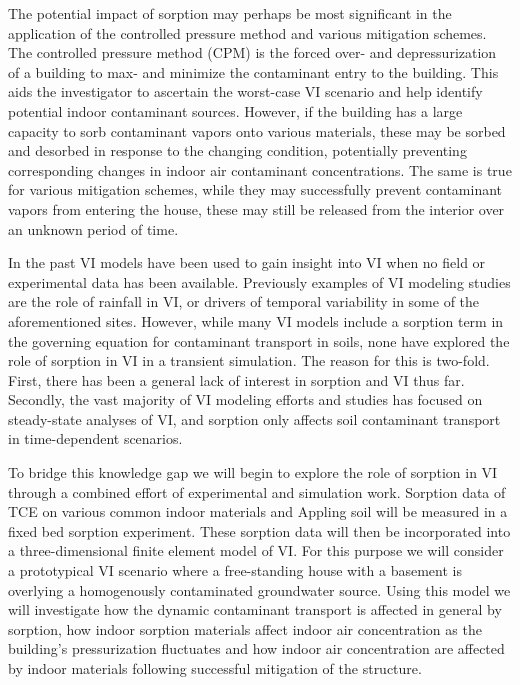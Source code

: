 The potential impact of sorption may perhaps be most significant in the application of the controlled pressure method and various mitigation schemes.
The controlled pressure method (CPM) is the forced over- and depressurization of a building to max- and minimize the contaminant entry to the building.
This aids the investigator to ascertain the worst-case VI scenario and help identify potential indoor contaminant sources\cite{mchugh_recent_2017,holton_long-term_2015}.
However, if the building has a large capacity to sorb contaminant vapors onto various materials, these may be sorbed and desorbed in response to the changing condition, potentially preventing corresponding changes in indoor air contaminant concentrations.
The same is true for various mitigation schemes, while they may successfully prevent contaminant vapors from entering the house, these may still be released from the interior over an unknown period of time\cite{meininghaus_diffusion_2000,meininghaus_diffusion_2002}.\par

In the past VI models have been used to gain insight into VI when no field or experimental data has been available.
Previously examples of VI modeling studies are the role of rainfall in VI\cite{shen_numerical_2012}, or drivers of temporal variability in some of the aforementioned sites\cite{strom_factors_2019}.
However, while many VI models include a sorption term in the governing equation for contaminant transport in soils, none have explored the role of sorption in VI in a transient simulation.
The reason for this is two-fold.
First, there has been a general lack of interest in sorption and VI thus far.
Secondly, the vast majority of VI modeling efforts and studies has focused on steady-state analyses of VI, and sorption only affects soil contaminant transport in time-dependent scenarios.\par

To bridge this knowledge gap we will begin to explore the role of sorption in VI through a combined effort of experimental and simulation work.
Sorption data of TCE on various common indoor materials and Appling soil will be measured in a fixed bed sorption experiment.
These sorption data will then be incorporated into a three-dimensional finite element model of VI.
For this purpose we will consider a prototypical VI scenario where a free-standing house with a basement is overlying a homogenously contaminated groundwater source.
Using this model we will investigate how the dynamic contaminant transport is affected in general by sorption, how indoor sorption materials affect indoor air concentration as the building's pressurization fluctuates and how indoor air concentration are affected by indoor materials following successful mitigation of the structure.\par
